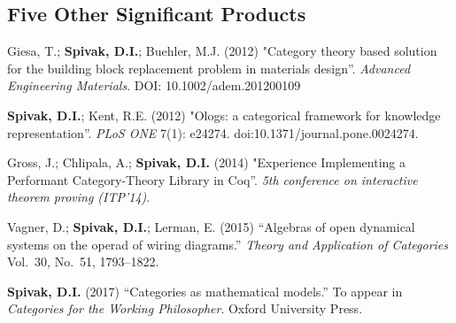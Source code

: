\documentclass[11pt,oneside,article]{memoir}
\theoremstyle{plain}
\theoremstyle{definition}
\theoremstyle{remark}
\begin{document}
\subsection{Five Other Significant Products}
\begin{compactitem}
  \item Giesa, T.; \textbf{Spivak, D.I.}; Buehler, M.J. (2012) "Category theory based solution for the building block replacement problem in materials design''. \emph{Advanced Engineering Materials}. DOI: 10.1002/adem.201200109
  \item \textbf{Spivak, D.I.}; Kent, R.E. (2012) "Ologs: a categorical framework for knowledge representation''.  \emph{PLoS ONE} 7(1): e24274. doi:10.1371/journal.pone.0024274.
  \item Gross, J.; Chlipala, A.; \textbf{Spivak, D.I.} (2014) "Experience Implementing a Performant Category-Theory Library in Coq''. \emph{5th conference on interactive theorem proving (ITP'14)}.
  \item Vagner, D.; \textbf{Spivak, D.I.}; Lerman, E. (2015) ``Algebras of open dynamical systems on the operad of wiring diagrams.'' \emph{Theory and Application of Categories} Vol.\ 30, No.\ 51, 1793--1822. 
  \item \textbf{Spivak, D.I.} (2017) ``Categories as mathematical models.'' To appear in \emph{Categories for the Working Philosopher}. Oxford University Press.
\end{compactitem}
\end{document}

